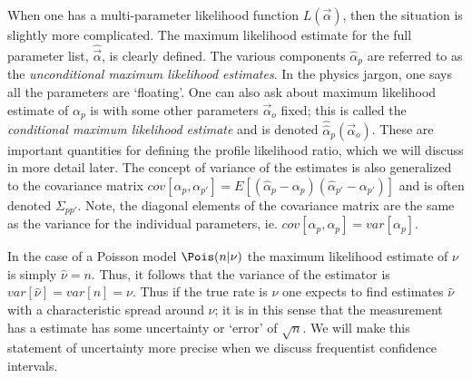 When one has a multi-parameter likelihood function $L(\vec{\alpha})$, then the situation is slightly more complicated.  The maximum likelihood estimate for the full parameter list, $\hat{\vec{\alpha}}$, is clearly defined.  The various components $\hat{\alpha}_p$ are referred to as the \textit{unconditional maximum likelihood estimates}.  In the physics jargon, one says all the parameters are `floating'.  One can also ask about maximum likelihood estimate of $\alpha_p$ is with some other parameters $\vec{\alpha}_o$ fixed; this is called the \textit{conditional maximum likelihood estimate} and is denoted $\hat{\hat{\alpha}}_p(\vec{\alpha}_o)$.  These are important quantities for defining the profile likelihood ratio, which we will discuss in more detail later.  The concept of variance of the estimates is also generalized to the covariance matrix $cov[\alpha_p, \alpha_{p'}] = E[(\hat\alpha_p - \alpha_p)(\hat\alpha_{p'}- \alpha_{p'})]$ and is often denoted $\Sigma_{pp'}$.  Note, the diagonal elements of the covariance matrix are the same as the variance for the individual parameters, ie. $cov[\alpha_p, \alpha_{p}] = var[\alpha_p]$.


In the case of a Poisson model $\Pois(n|\nu)$ the maximum likelihood estimate of $\nu$ is simply \mbox{$\hat{\nu}=n$}.  Thus, it follows that the variance of the estimator is $var[\hat{\nu}]=var[n]=\nu$.  Thus if the true rate is $\nu$ one expects to find estimates $\hat{\nu}$ with a characteristic spread around $\nu$; it is in this sense that the measurement has a estimate has some uncertainty or `error' of $\sqrt{n}$.  We will make this statement of uncertainty more precise when we discuss frequentist confidence intervals.


